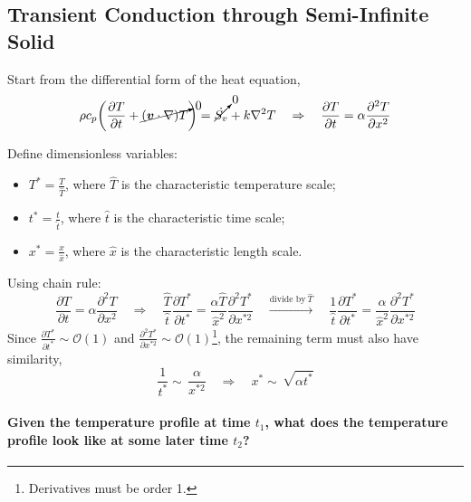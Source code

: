 \documentclass[12pt, a4paper]{article}
\begin{document}
\subsection{Transient Conduction through Semi-Infinite Solid}
Start from the differential form of the heat equation,
\[
    \rho c_{p} \bigg( \frac{\partial T}{\partial t} +\cancelto{0}{(\bm{v} \cdot \nabla) T} \bigg) = \cancelto{0}{\dot{S_{v}}}  +k \nabla^{2} T \quad \Rightarrow \quad \frac{\partial T}{\partial t} = \alpha \frac{\partial^2 T}{\partial x^2}
\]

Define dimensionless variables:
\begin{itemize}
    \item $T^{*} = \frac{T}{\hat{T}}$, where $\hat{T}$ is the characteristic temperature scale;
    \item $t^{*} = \frac{t}{\hat{t}}$, where $\hat{t}$ is the characteristic time scale;
    \item $x^{*} = \frac{x}{\hat{x}}$, where $\hat{x}$ is the characteristic length scale.
\end{itemize}
Using chain rule:
\[
    \frac{\partial T}{\partial t} = \alpha \frac{\partial^2 T}{\partial x^2}
    \quad \Rightarrow \quad
    \frac{\hat{T}}{\hat{t}} \frac{\partial T^{*}}{\partial t^{*}} = \frac{\alpha \hat{T}}{\hat{x}^{2}} \frac{\partial^{2}T^{*}}{\partial x^{*2}} \quad \xrightarrow[]{\text{divide by} \ \hat{T}} \quad \frac{1}{\hat{t}} \frac{\partial T^{*}}{\partial t^{*}} = \frac{\alpha}{\hat{x}^{2}} \frac{\partial^{2}T^{*}}{\partial x^{*2}}
\]
Since $\displaystyle \frac{\partial T^{*}}{\partial t^{*}} \sim \mathcal{O}(1)$ and $\displaystyle \frac{\partial^2 T^{*}}{\partial x^{*2}} \sim \mathcal{O}(1)$\footnote{Derivatives must be order 1.}, the remaining term must also have similarity,
\[
    \frac{1}{t^{*}} \sim \, \frac{\alpha}{x^{*2}}
    \quad \Rightarrow \quad x^{*} \sim \, \sqrt{\alpha t^{*}}
\]
\paragraph{Given the temperature profile at time $t_1$, what does the temperature profile look like at some later time $t_2$?}
\end{document}
